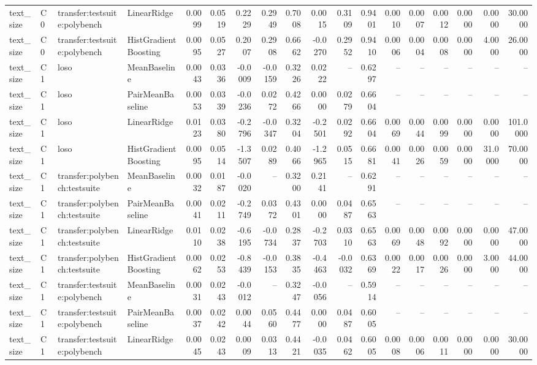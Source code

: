 \begin{table}[t]
\begin{tabular}{llllrrrrrrrrrrrrrr}
text\_size & C0 & transfer:testsuite:polybench & LinearRidge & 0.0099 & 0.0519 & 0.2229 & 0.2949 & 0.7008 & 0.0015 & 0.3109 & 0.9401 & 0.0010 & 0.0007 & 0.0012 & 0.0000 & 0.0000 & 30.0000 \\
text\_size & C0 & transfer:testsuite:polybench & HistGradientBoosting & 0.0095 & 0.0527 & 0.2007 & 0.2908 & 0.6662 & -0.0270 & 0.2952 & 0.9410 & 0.0006 & 0.0004 & 0.0008 & 0.0000 & 4.0000 & 26.0000 \\
text\_size & C1 & loso & MeanBaseline & 0.0043 & 0.0336 & -0.0009 & -0.0159 & 0.3226 & 0.0222 & -- & 0.6297 & -- & -- & -- & -- & -- & -- \\
text\_size & C1 & loso & PairMeanBaseline & 0.0053 & 0.0339 & -0.0236 & 0.0272 & 0.4266 & 0.0000 & 0.0279 & 0.6604 & -- & -- & -- & -- & -- & -- \\
text\_size & C1 & loso & LinearRidge & 0.0123 & 0.0380 & -0.2796 & -0.0347 & 0.3204 & -0.2501 & 0.0292 & 0.6604 & 0.0069 & 0.0044 & 0.0099 & 0.0000 & 0.0000 & 101.0000 \\
text\_size & C1 & loso & HistGradientBoosting & 0.0095 & 0.0514 & -1.3507 & 0.0289 & 0.4066 & -1.2965 & 0.0515 & 0.6681 & 0.0041 & 0.0026 & 0.0059 & 0.0000 & 31.0000 & 70.0000 \\
text\_size & C1 & transfer:polybench:testsuite & MeanBaseline & 0.0032 & 0.0187 & -0.0020 & -- & 0.3200 & 0.2141 & -- & 0.6291 & -- & -- & -- & -- & -- & -- \\
text\_size & C1 & transfer:polybench:testsuite & PairMeanBaseline & 0.0041 & 0.0211 & -0.2749 & 0.0372 & 0.4301 & 0.0000 & 0.0487 & 0.6563 & -- & -- & -- & -- & -- & -- \\
text\_size & C1 & transfer:polybench:testsuite & LinearRidge & 0.0110 & 0.0238 & -0.6195 & -0.0734 & 0.2837 & -0.2703 & 0.0310 & 0.6563 & 0.0069 & 0.0048 & 0.0092 & 0.0000 & 0.0000 & 47.0000 \\
text\_size & C1 & transfer:polybench:testsuite & HistGradientBoosting & 0.0062 & 0.0253 & -0.8439 & -0.0153 & 0.3835 & -0.4463 & -0.0032 & 0.6369 & 0.0022 & 0.0017 & 0.0026 & 0.0000 & 3.0000 & 44.0000 \\
text\_size & C1 & transfer:testsuite:polybench & MeanBaseline & 0.0031 & 0.0243 & -0.0012 & -- & 0.3247 & -0.0056 & -- & 0.5914 & -- & -- & -- & -- & -- & -- \\
text\_size & C1 & transfer:testsuite:polybench & PairMeanBaseline & 0.0037 & 0.0242 & 0.0044 & 0.0560 & 0.4477 & 0.0000 & 0.0487 & 0.6005 & -- & -- & -- & -- & -- & -- \\
text\_size & C1 & transfer:testsuite:polybench & LinearRidge & 0.0045 & 0.0243 & 0.0009 & 0.0313 & 0.4421 & -0.0035 & 0.0462 & 0.6005 & 0.0008 & 0.0006 & 0.0011 & 0.0000 & 0.0000 & 30.0000 \\

\end{tabular}
\end{table}
